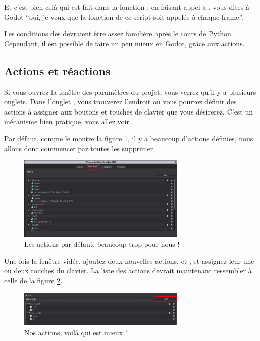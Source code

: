 Et c'est bien celà qui est fait dans la fonction  : en faisant appel à , vous dites à Godot ``oui, je veux que la fonction  de ce script soit appelée à chaque frame''.

Les conditions des  devraient être assez familière après le cours de Python. Cependant, il est possible de faire un peu mieux en Godot, grâce aux actions.

\subsection{Actions et réactions}

Si vous ouvrez la fenêtre des paramètres du projet, vous verrez qu'il y a plusieurs onglets. Dans l'onglet , vous trouverez l'endroit où vous pourrez définir des actions à assigner aux boutons et touches de clavier que vous désirerez. C'est un mécanisme bien pratique, vous allez voir.

Par défaut, comme le montre la figure \ref{lvl1-actions}, il y a beaucoup d'actions définies, nous allons donc commencer par toutes les supprimer.

\begin{figure}
  \begin{center}
    \includegraphics[width=8cm]{img/lvl1-actions.png}
  \end{center}
  \caption{\label{lvl1-actions} Les actions par défaut, beaucoup trop pour nous !}
\end{figure}

Une fois la fenêtre vidée, ajoutez deux nouvelles actions,  et , et assignez-leur une ou deux touches du clavier. La liste des actions devrait maintenant ressembler à celle de la figure \ref{lvl1-ouractions}.

\begin{figure}
  \begin{center}
    \includegraphics[width=8cm]{img/lvl1-ouractions.png}
  \end{center}
  \caption{\label{lvl1-ouractions} Nos actions, voilà qui est mieux !}
\end{figure}

